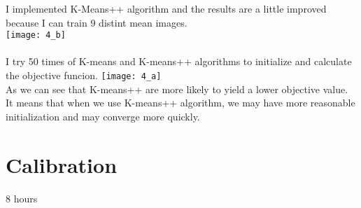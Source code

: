 \documentclass[10pt,letter]{article}
\numberwithin{equation}{section} %
\numberwithin{figure}{section} %
\numberwithin{table}{section} %
\begin{document}
I implemented K-Means++ algorithm and the results are a little improved because I can train 9 distint mean images.\\
\texttt{[image: 4\_b]}\\
\\
I try 50 times of K-means and K-means++ algorithms to initialize and calculate the objective funcion.
\texttt{[image: 4\_a]}\\
As we can see that K-means++ are more likely to yield a lower objective value. It means that when we use K-means++ algorithm, we may have more reasonable initialization and may converge more quickly.

\newpage
\section{Calibration}
8 hours
	
\end{document}
